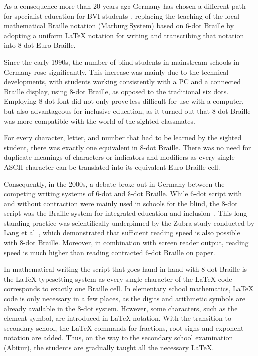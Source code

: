 \documentclass{easychair}
\begin{document}
As a consequence more than 20 years ago Germany has chosen a different path for
specialist education for BVI students~\cite{kalina93, kalina98, Lorenz02},
replacing the teaching of the local mathematical Braille notation (Marburg
System) based on 6-dot Braille by adopting a uniform {\LaTeX} notation for writing
and transcribing that notation into 8-dot Euro Braille.

Since the early 1990s, the number of blind students in mainstream schools in
Germany rose significantly. This increase was mainly due to the technical
developments, with students working consistently with a PC and a connected
Braille display, using 8-dot Braille, as opposed to the traditional six
dots. Employing 8-dot font did not only prove less difficult for use with a
computer, but also advantageous for inclusive education, as it turned out that
8-dot Braille was more compatible with the world of the sighted classmates.

For every character, letter, and number that had to be learned by the sighted
student, there was exactly one equivalent in 8-dot Braille. There was no need
for duplicate meanings of characters or indicators and modifiers as every single
ASCII character can be translated into its equivalent Euro Braille cell.
  
Consequently, in the 2000s, a debate broke out in Germany between the competing
writing systems of 6-dot and 8-dot Braille. While 6-dot script with and without
contraction were mainly used in schools for the blind, the 8-dot script was the
Braille system for integrated education and inclusion~\cite{hallmann01}.  This
long-standing practice was scientifically underpinned by the Zubra study conducted
by Lang et al~\cite{Lang20, Zubra}, which demonstrated that sufficient reading
speed is also possible with 8-dot Braille. Moreover, in combination with screen
reader output, reading speed is much higher than reading contracted 6-dot
Braille on paper.

In mathematical writing the script that goes hand in hand with 8-dot Braille is
the {\LaTeX} typesetting system as every single character of the {\LaTeX} code
corresponds to exactly one Braille cell. In elementary school mathematics,
{\LaTeX} code is only necessary in a few places, as the digits and arithmetic
symbols are already available in the 8-dot system. However, some characters,
such as the element symbol, are introduced in {\LaTeX} notation.  With the
transition to secondary school, the {\LaTeX} commands for fractions, root signs
and exponent notation are added. Thus, on the way to the secondary school
examination (Abitur), the students are gradually taught all the necessary
{\LaTeX}.
\end{document}
